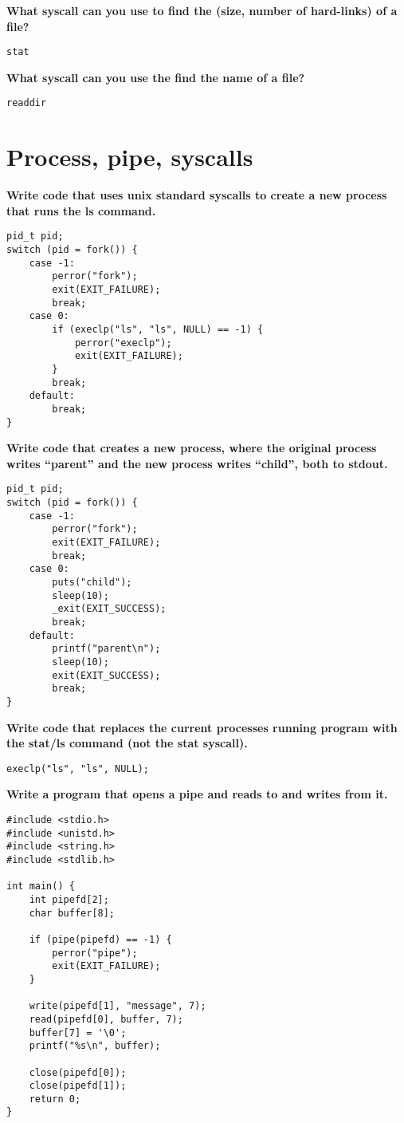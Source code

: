 \documentclass{article}
\begin{document}
\textbf{What syscall can you use to find the (size, number of hard-links) of a file?}

\begin{verbatim}
stat
\end{verbatim}

\textbf{What syscall can you use the find the name of a file?}

\begin{verbatim}
readdir
\end{verbatim}

\section*{Process, pipe, syscalls}
\textbf{Write code that uses unix standard syscalls to create a new process that runs the ls
command.}

\begin{verbatim}
pid_t pid;
switch (pid = fork()) {
    case -1:
        perror("fork");
        exit(EXIT_FAILURE);
        break;
    case 0:
        if (execlp("ls", "ls", NULL) == -1) {
            perror("execlp");
            exit(EXIT_FAILURE);
        }
        break;
    default:
        break;
}
\end{verbatim}

\textbf{Write code that creates a new process, where the original process writes ``parent'' and the
new process writes ``child'', both to stdout.}

\begin{verbatim}
pid_t pid;
switch (pid = fork()) {
    case -1:
        perror("fork");
        exit(EXIT_FAILURE);
        break;
    case 0:
        puts("child");
        sleep(10);
        _exit(EXIT_SUCCESS);
        break;
    default:
        printf("parent\n");
        sleep(10);
        exit(EXIT_SUCCESS);
        break;
}
\end{verbatim}

\textbf{Write code that replaces the current processes running program with the stat/ls command
(not the stat syscall).}

\begin{verbatim}
execlp("ls", "ls", NULL);
\end{verbatim}

\pagebreak

\textbf{Write a program that opens a pipe and reads to and writes from it.}

\begin{verbatim}
#include <stdio.h>
#include <unistd.h>
#include <string.h>
#include <stdlib.h>

int main() {
    int pipefd[2];
    char buffer[8];

    if (pipe(pipefd) == -1) {
        perror("pipe");
        exit(EXIT_FAILURE);
    }

    write(pipefd[1], "message", 7);
    read(pipefd[0], buffer, 7);
    buffer[7] = '\0';
    printf("%s\n", buffer);

    close(pipefd[0]);
    close(pipefd[1]);
    return 0;
}
\end{verbatim}
\end{document}
